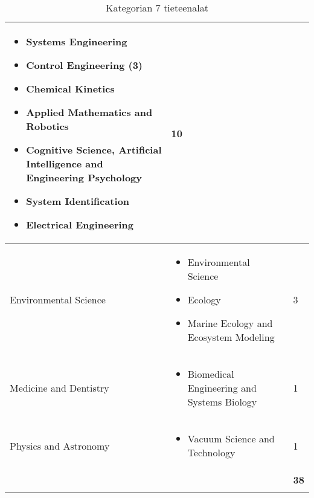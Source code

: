 \documentclass[utf8]{gradu3}
\begin{document}
\begin{longtable}[h]{|p{5cm}|p{8cm}|p{1cm}|}
\begin{itemize}
        \item Systems Engineering
        \item Control Engineering (3)
        \item Chemical Kinetics
        \item Applied Mathematics and Robotics
        \item Cognitive Science, Artificial Intelligence and Engineering Psychology
        \item System Identification
        \item Electrical Engineering
    \end{itemize} & 10 \\
    \hline
    Environmental Science & \begin{itemize}
        \item Environmental Science
        \item Ecology
        \item Marine Ecology and Ecosystem Modeling
    \end{itemize} & 3 \\
    \hline
    Medicine and Dentistry & \begin{itemize}
        \item Biomedical Engineering and Systems Biology
    \end{itemize} & 1 \\
    \hline
    Physics and Astronomy & \begin{itemize}
        \item Vacuum Science and Technology
    \end{itemize} & 1 \\
    \hline
       &   & \textbf{38} \\
    \hline
    \caption{Kategorian 7 tieteenalat}
    \label{table:Kategorian 7 tieteenalat}
\end{longtable}
\end{document}
